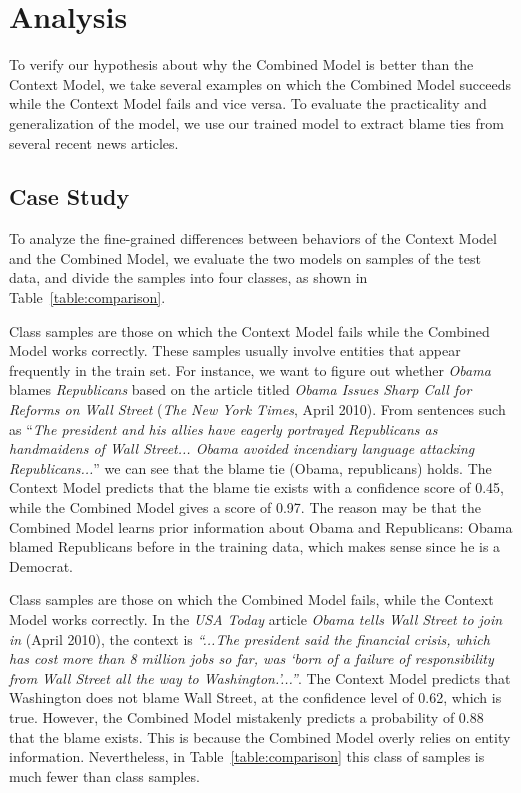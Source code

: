 \documentclass[letterpaper]{article} %
\begin{document}
\section{Analysis}

To verify our hypothesis about why the Combined Model is better than the Context Model, we take several examples on which the Combined Model succeeds while the Context Model fails and vice versa. To evaluate the practicality and generalization of the model, we use our trained model to extract blame ties from several recent news articles.

\subsection{Case Study}

To analyze the fine-grained differences between behaviors of the Context Model and the Combined Model, we evaluate the two models on samples of the test data, and divide the samples into four classes, as shown in Table~\ref{table:comparison}.

Class  samples are those on which the Context Model fails while the Combined Model works correctly. These samples usually involve entities that appear frequently in the train set. For instance, we want to figure out whether {\it Obama} blames {\it Republicans} based on the article titled {\it Obama Issues Sharp Call for Reforms on Wall Street} ({\it The New York Times}, April 2010). From sentences such as ``{\it The president and his allies have eagerly portrayed Republicans as handmaidens of Wall Street... Obama avoided incendiary language attacking Republicans...}'' we can see that the blame tie (Obama, republicans) holds. The Context Model predicts that the blame tie exists with a confidence score of 0.45, while the Combined Model gives a score of 0.97. The reason may be that the Combined Model learns prior information about Obama and Republicans: Obama blamed Republicans before in the training data, which makes sense since he is a Democrat.

Class  samples are those on which the Combined Model fails, while the Context Model works correctly. In the {\it USA Today} article {\it Obama tells Wall Street to join in} (April 2010), the context is {\it ``...The president said the financial crisis, which has cost more than 8 million jobs so far, was `born of a failure of responsibility from Wall Street all the way to Washington.'...''}. The Context Model predicts that Washington does not blame Wall Street, at the confidence level of 0.62, which is true. However, the Combined Model mistakenly predicts a probability of 0.88 that the blame exists. This is because the Combined Model overly relies on entity information. Nevertheless, in Table~\ref{table:comparison} this class of samples is much fewer than class  samples.
\end{document}
